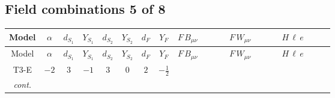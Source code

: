 \documentclass[8pt]{article}
\begin{document}
\begin{landscape}
\subsection*{Field combinations 5 of 8}
\begin{longtable}{@{}cccccccc >{\raggedright\arraybackslash}p{0.21\linewidth} >{\raggedright\arraybackslash}p{0.21\linewidth} >{\raggedright\arraybackslash}p{0.21\linewidth}@{}}
\toprule
Model & $\alpha$ & $d_{S_1}$ & $Y_{S_1}$ & $d_{S_2}$ & $Y_{S_2}$ & $d_F$ & $Y_F$ & $F\,B_{\mu\nu}$ & $F\,W_{\mu\nu}$ & $H\,\ell\,e$ \\
\midrule
\endfirsthead
\toprule
Model & $\alpha$ & $d_{S_1}$ & $Y_{S_1}$ & $d_{S_2}$ & $Y_{S_2}$ & $d_F$ & $Y_F$ & $F\,B_{\mu\nu}$ & $F\,W_{\mu\nu}$ & $H\,\ell\,e$ \\
\midrule
\endhead
T3-E & $-2$ & $3$ & $-1$ & $3$ & $0$ & $2$ & $-\frac{1}{2}$ & \scriptsize\adjustbox{max width=\linewidth}{$\begin{gathered} -\frac{1}{2} \hbar  \log \left(\frac{\bar{\mu}^{2}}{M_F^2}\right) B_{\mu _1\mu _2}^2\end{gathered}$} & \scriptsize\adjustbox{max width=\linewidth}{$\begin{gathered} -\frac{1}{2} \hbar  \log \left(\frac{\bar{\mu}^{2}}{M_F^2}\right) \left(W_{\mu _1\mu _2}^{A_1}\right){}^2\end{gathered}$} & \scriptsize\adjustbox{max width=\linewidth}{$\begin{gathered} +\frac{\sqrt{3} \hbar  \overline{y_{1,i_3,r_1}} \overline{L_{a_1,i_2}}\, P_R\, e_{i_1} H_{a_1} y_{1,i_2,r_1} Y_{e,i_3,i_1}}{4 \epsilon } \\ +\frac{3}{8} \sqrt{3} \hbar  \overline{y_{1,i_3,r_1}} \overline{L_{a_1,i_2}}\, P_R\, e_{i_1} H_{a_1} y_{1,i_2,r_1} Y_{e,i_3,i_1} \\ +\frac{\sqrt{3} \hbar  \overline{y_{2,i_3,r_1}} \overline{L_{a_1,i_2}}\, P_R\, e_{i_1} H_{a_1} y_{2,i_2,r_1} Y_{e,i_3,i_1}}{4 \epsilon }\end{gathered}$} \\
\textit{cont.} &  &  &  &  &  &  &  &  &  & \scriptsize\adjustbox{max width=\linewidth}{$\begin{gathered} +\frac{3}{8} \sqrt{3} \hbar  \overline{y_{2,i_3,r_1}} \overline{L_{a_1,i_2}}\, P_R\, e_{i_1} H_{a_1} y_{2,i_2,r_1} Y_{e,i_3,i_1} \\ +\frac{\sqrt{3} \hbar  \overline{y_{1,i_1,r_1}} \overline{Y_{e,i_3,i_2}} \overline{e_{i_2}}\, P_L\, L_{a_1,i_1} y_{1,i_3,r_1} H_{a_1}{}^{\dagger }}{4 \epsilon } \\ +\frac{3}{8} \sqrt{3} \hbar  \overline{y_{1,i_1,r_1}} \overline{Y_{e,i_3,i_2}} \overline{e_{i_2}}\, P_L\, L_{a_1,i_1} y_{1,i_3,r_1} H_{a_1}{}^{\dagger }\end{gathered}$} \\

\end{longtable}
\end{landscape}
\end{document}
